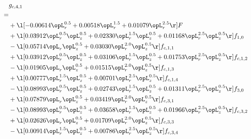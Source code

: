 \begin{alignat}{2} 
\label{eq:g_41_0} 
& g_{c,4,1} \nonumber \\ 
 = \\ 
& + \l[  -0.00614 \opL_r^{0.5} +  0.00518 \opL_r^{1.5} +  0.01079 \opL_r^{2.5}  \r] F \nonumber \\ 
& + \l[  0.03912 \opL_r^{0.5} \opL_z^{0.5} +  0.02330 \opL_r^{1.5} \opL_z^{0.5} +  0.01168 \opL_r^{2.5} \opL_z^{0.5}  \r] f_{1,0} \nonumber \\ 
& - \l[  0.05714 \opL_r \opL_z^{0.5} +  0.03030 \opL_r^{2.0} \opL_z^{0.5}  \r] f_{c,1,1} \nonumber \\ 
& + \l[  0.03912 \opL_r^{0.5} \opL_z^{0.5} +  0.03106 \opL_r^{1.5} \opL_z^{0.5} +  0.01753 \opL_r^{2.5} \opL_z^{0.5}  \r] f_{c,1,2} \nonumber \\ 
& - \l[  0.01905 \opL_r \opL_z^{0.5} +  0.01515 \opL_r^{2.0} \opL_z^{0.5}  \r] f_{c,1,3} \nonumber \\ 
& + \l[  0.00777 \opL_r^{1.5} \opL_z^{0.5} +  0.00701 \opL_r^{2.5} \opL_z^{0.5}  \r] f_{c,1,4} \nonumber \\ 
& - \l[  0.08993 \opL_r^{0.5} \opL_z^{0.5} +  0.02743 \opL_r^{1.5} \opL_z^{0.5} +  0.01311 \opL_r^{2.5} \opL_z^{0.5}  \r] f_{3,0} \nonumber \\ 
& + \l[  0.07879 \opL_r \opL_z^{0.5} +  0.03419 \opL_r^{2.0} \opL_z^{0.5}  \r] f_{c,3,1} \nonumber \\ 
& - \l[  0.08993 \opL_r^{0.5} \opL_z^{0.5} +  0.03658 \opL_r^{1.5} \opL_z^{0.5} +  0.01966 \opL_r^{2.5} \opL_z^{0.5}  \r] f_{c,3,2} \nonumber \\ 
& + \l[  0.02626 \opL_r \opL_z^{0.5} +  0.01709 \opL_r^{2.0} \opL_z^{0.5}  \r] f_{c,3,3} \nonumber \\ 
& - \l[  0.00914 \opL_r^{1.5} \opL_z^{0.5} +  0.00786 \opL_r^{2.5} \opL_z^{0.5}  \r] f_{c,3,4} \nonumber \\ 
\end{alignat} 


